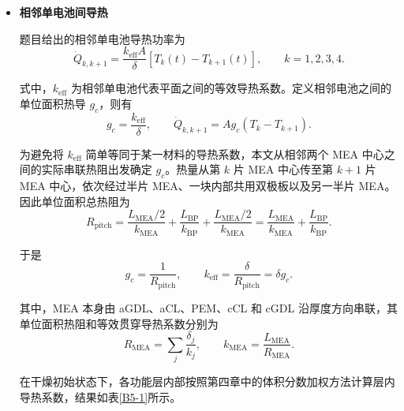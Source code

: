 \documentclass[bwprint]{gmcmthesis}
\numberwithin{figure}{section}
\begin{document}
\begin{itemize}
\renewcommand{\labelitemi}{$\blacktriangleright$}
\item \textbf {相邻单电池间导热}

\noindent 题目给出的相邻单电池导热功率为
\begin{equation}
\dot{Q}_{k,k+1} = \frac{k_{\text{eff}}A}{\delta} [T_k(t) - T_{k+1}(t)], \qquad k = 1, 2, 3, 4. \tag{5-5}
\end{equation}

\noindent 式中，\(k_{\text{eff}}\) 为相邻单电池代表平面之间的等效导热系数。定义相邻电池之间的单位面积热导 \(g_c\)，则有
\begin{equation}
g_c = \frac{k_{\text{eff}}}{\delta}, \qquad \dot{Q}_{k,k+1} = A g_c (T_k - T_{k+1}). \tag{5-6}
\end{equation}

\noindent 为避免将 \(k_{\text{eff}}\) 简单等同于某一材料的导热系数，本文从相邻两个 MEA 中心之间的实际串联热阻出发确定 \(g_c\)。热量从第 \(k\) 片 MEA 中心传至第 \(k+1\) 片 MEA 中心，依次经过半片 MEA、一块内部共用双极板以及另一半片 MEA。因此单位面积总热阻为
\begin{equation}
R_{\text{pitch}} = \frac{L_{\text{MEA}}/2}{k_{\text{MEA}}} + \frac{L_{\text{BP}}}{k_{\text{BP}}} + \frac{L_{\text{MEA}}/2}{k_{\text{MEA}}} = \frac{L_{\text{MEA}}}{k_{\text{MEA}}} + \frac{L_{\text{BP}}}{k_{\text{BP}}}. \tag{5-7}
\end{equation}

\noindent 于是
\begin{equation}
g_c = \frac{1}{R_{\text{pitch}}}, \qquad k_{\text{eff}} = \frac{\delta}{R_{\text{pitch}}} = \delta g_c. \tag{5-8}
\end{equation}

\noindent 其中，MEA 本身由 aGDL、aCL、PEM、cCL 和 cGDL 沿厚度方向串联，其单位面积热阻和等效贯穿导热系数分别为
\begin{equation}
R_{\text{MEA}} = \sum_j \frac{\delta_j}{k_j}, \qquad k_{\text{MEA}} = \frac{L_{\text{MEA}}}{R_{\text{MEA}}}. \tag{5-9}
\end{equation}

\noindent 在干燥初始状态下，各功能层内部按照第四章中的体积分数加权方法计算层内导热系数，结果如表\ref{B5-1}所示。


\end{itemize}
\end{document}
